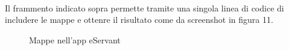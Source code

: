 \paragraph{}
Il frammento indicato sopra permette tramite una singola linea di codice
di includere le mappe e ottenre il risultato come da screenshot in figura 11.
\begin{figure}[htp]
    \centering  
    \caption{Mappe nell'app eServant}

\end{figure}
